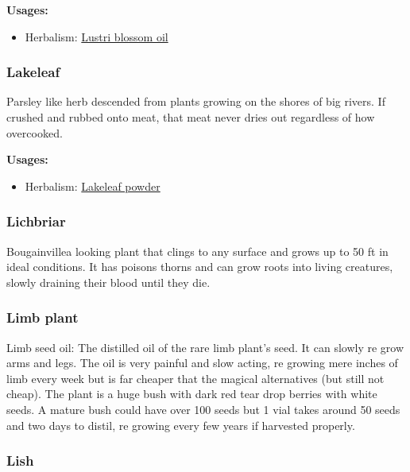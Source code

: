 \vspace{5mm}

\textbf{Usages:}

\begin{itemize}[noitemsep]
\item[] Herbalism: \hyperref[Lustri blossom oil]{Lustri blossom oil}
\end{itemize}

\subsubsection{Lakeleaf}
\label{Lakeleaf}

Parsley like herb descended from plants growing on the shores of big rivers. If crushed and rubbed onto meat, that meat never dries out regardless of how overcooked.

\vspace{5mm}

\textbf{Usages:}

\begin{itemize}[noitemsep]
\item[] Herbalism: \hyperref[Lakeleaf powder]{Lakeleaf powder}
\end{itemize}

\subsubsection{Lichbriar}
\label{Lichbriar}

Bougainvillea looking plant that clings to any surface and grows up to 50 ft in ideal conditions. It has poisons thorns and can grow roots into living creatures, slowly draining their blood until they die. 

\subsubsection{Limb plant}
\label{limb_plant}

Limb seed oil: The distilled oil of the rare limb plant's seed. It can slowly re grow arms and legs. The oil is very painful and slow acting, re growing mere inches of limb every week but is far cheaper that the magical alternatives (but still not cheap). The plant is a huge bush with dark red tear drop berries with white seeds. A mature bush could have over 100 seeds but 1 vial takes around 50 seeds and two days to distil, re growing every few years if harvested properly.

\subsubsection{Lish}
\label{Lish}

